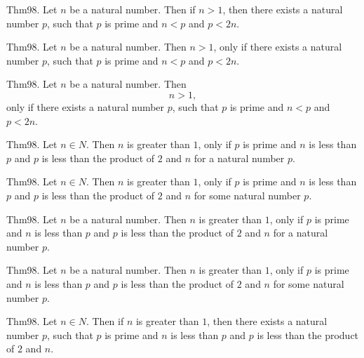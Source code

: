 \documentclass{article}
\begin{document}
Thm98. Let $n$ be a natural number. Then if $n > 1$, then there exists a natural number $p$, such that $p$ is prime and $n < p$ and $p < 2 n$.

Thm98. Let $n$ be a natural number. Then $n > 1$, only if there exists a natural number $p$, such that $p$ is prime and $n < p$ and $p < 2 n$.

Thm98. Let $n$ be a natural number. Then $$n > 1,$$ only if there exists a natural number $p$, such that $p$ is prime and $n < p$ and $p < 2 n$.

Thm98. Let $n \in N$. Then $n$ is greater than $1$, only if $p$ is prime and $n$ is less than $p$ and $p$ is less than the product of $2$ and $n$ for a natural number $p$.

Thm98. Let $n \in N$. Then $n$ is greater than $1$, only if $p$ is prime and $n$ is less than $p$ and $p$ is less than the product of $2$ and $n$ for some natural number $p$.

Thm98. Let $n$ be a natural number. Then $n$ is greater than $1$, only if $p$ is prime and $n$ is less than $p$ and $p$ is less than the product of $2$ and $n$ for a natural number $p$.

Thm98. Let $n$ be a natural number. Then $n$ is greater than $1$, only if $p$ is prime and $n$ is less than $p$ and $p$ is less than the product of $2$ and $n$ for some natural number $p$.

Thm98. Let $n \in N$. Then if $n$ is greater than $1$, then there exists a natural number $p$, such that $p$ is prime and $n$ is less than $p$ and $p$ is less than the product of $2$ and $n$.
\end{document}
